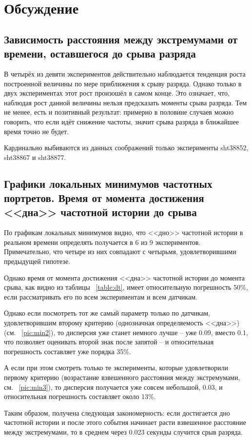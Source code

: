 \section{Обсуждение}\label{discuss}
\subsection{Зависимость расстояния между экстремумами от времени, оставшегося до срыва разряда}

В четырёх из девяти экспериментов действительно наблюдается тенденция роста построенной величины по мере приближения к срыву разряда. Однако только в двух экспериментах этот рост произошёл в самом конце. Это означает, что, наблюдая рост данной величины нельзя предсказать моменты срыва разряда. Тем не менее, есть и позитивный результат: примерно в половине случаев можно говорить, что если идёт снижение частоты, значит срыва разряда в ближайшее время точно не будет.

Кардинально выбиваются из данных соображений только эксперименты sht38852, sht38867 и sht38877.

\subsection{Графики локальных минимумов частотных портретов. Время от момента достижения <<дна>> частотной истории до срыва}

По графикам локальных минимумов видно, что <<дно>> частотной истории в реальном времени определять получается в 6 из 9 экспериментов. Примечательно, что четыре из них совпадают с четырьмя, удовлетворившими предыдущей гипотезе.

Однако время от момента достижения <<дна>> частотной истории до момента срыва, как видно из таблицы ~\ref{table:dt}, имеет относительную погрешность 50\%, если рассматривать его по всем экспериментам и всем датчикам.

Однако если посмотреть тот же самый параметр только по датчикам, удовлетворившим второму критерию (однозначная определяемость <<дна>>) (см. ~\ref{pic:min2}), то дисперсия уже станет немного лучше -- уже 0.09, вместо 0.1, что позволяет оценивать второй знак после запятой -- и относительная погрешность составляет уже порядка 35\%. 

А если при этом смотреть только те эксперименты, которые удовлетворили первому критерию (возрастание взвешенного расстояния между экстремумами, см. ~\ref{pic:min3}), то дисперсия получается уже совсем небольшой, 0.03, и относительная погрешность составляет около 13\%.

Таким образом, получена следующая закономерность: если достигается дно частотной истории и после этого события начинает расти взвешенное расстояние между экстремумами, то в среднем через 0.023 секунды случится срыв разряда.